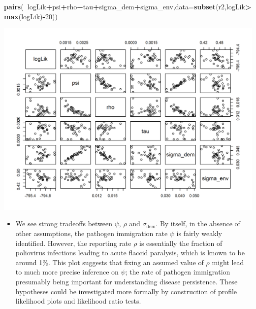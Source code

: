 \documentclass[]{article}
\newenvironment{Shaded}{\begin{snugshade}}{\end{snugshade}}
\newcommand{\KeywordTok}[1]{\textcolor[rgb]{0.13,0.29,0.53}{\textbf{#1}}}
\newcommand{\DataTypeTok}[1]{\textcolor[rgb]{0.13,0.29,0.53}{#1}}
\newcommand{\DecValTok}[1]{\textcolor[rgb]{0.00,0.00,0.81}{#1}}
\newcommand{\OperatorTok}[1]{\textcolor[rgb]{0.81,0.36,0.00}{\textbf{#1}}}
\newcommand{\NormalTok}[1]{#1}
\providecommand{\tightlist}{%
  \setlength{\itemsep}{0pt}\setlength{\parskip}{0pt}}
\begin{document}
\begin{Shaded}
\begin{Highlighting}[]
\KeywordTok{pairs}\NormalTok{(}\OperatorTok{~}\NormalTok{logLik}\OperatorTok{+}\NormalTok{psi}\OperatorTok{+}\NormalTok{rho}\OperatorTok{+}\NormalTok{tau}\OperatorTok{+}\NormalTok{sigma_dem}\OperatorTok{+}\NormalTok{sigma_env,}\DataTypeTok{data=}\KeywordTok{subset}\NormalTok{(r2,logLik}\OperatorTok{>}\KeywordTok{max}\NormalTok{(logLik)}\OperatorTok{-}\DecValTok{20}\NormalTok{))}
\end{Highlighting}
\end{Shaded}

\begin{center}\includegraphics{figure/sp500-pairs-1} \end{center}

\begin{itemize}
\tightlist
\item
  We see strong tradeoffs between \(\psi\), \(\rho\) and
  \(\sigma_\mathrm{dem}\). By itself, in the absence of other
  assumptions, the pathogen immigration rate \(\psi\) is fairly weakly
  identified. However, the reporting rate \(\rho\) is essentially the
  fraction of poliovirus infections leading to acute flaccid paralysis,
  which is known to be around 1\%. This plot suggests that fixing an
  assumed value of \(\rho\) might lead to much more precise inference on
  \(\psi\); the rate of pathogen immigration presumably being important
  for understanding disease persistence. These hypotheses could be
  investigated more formally by construction of profile likelihood plots
  and likelihood ratio tests.
\end{itemize}
\end{document}
